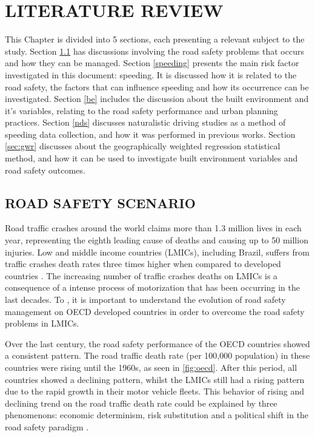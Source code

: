 

\chapter{LITERATURE REVIEW}

This Chapter is divided into 5 sections, each presenting a relevant subject to the study. Section \ref{sec:rss} has discussions involving the road safety problems that occurs and how they can be managed. Section \ref{speeding} presents the main risk factor investigated in this document: speeding. It is discussed how it is related to the road safety, the factors that can influence speeding and how its occurrence can be investigated. Section \ref{be} includes the discussion about the built environment and it's variables, relating to the road safety performance and urban planning practices. Section \ref{nds} discusses naturalistic driving studies as a method of speeding data collection, and how it was performed in previous works. Section \ref{sec:gwr} discusses about the geographically weighted regression statistical method, and how it can be used to investigate built environment variables and road safety outcomes.

\section{ROAD SAFETY SCENARIO} \label{sec:rss}

Road traffic crashes around the world claims more than 1.3 million lives in each year, representing the eighth leading cause of deaths and causing up to 50 million injuries. Low and middle income countries (LMICs), including Brazil, suffers from traffic crashes death rates three times higher when compared to developed countries \cite{WHO2018}. The increasing number of traffic crashes deaths on LMICs is a consequence of a intense process of motorization that has been occurring in the last decades. To \textcite{Bhalla2016}, it is important to understand the evolution of road safety management on OECD developed countries in order to overcome the road safety problems in LMICs. 

Over the last century, the road safety performance of the OECD countries showed a consistent pattern. The road traffic death rate (per 100,000 population) in these countries were rising until the 1960s, as seen in \autoref{fig:oecd}. After this period, all countries showed a declining pattern, whilst the LMICs still had a rising pattern due to the rapid growth in their motor vehicle fleets. This behavior of rising and declining trend on the road traffic death rate could be explained by three phenomenons: economic determinism, risk substitution and a political shift in the road safety paradigm \cite{Bhalla2016}.

